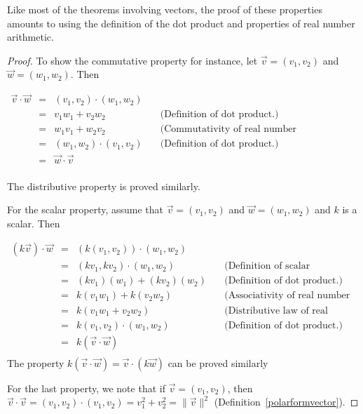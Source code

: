 \ifcourse
Like most of the theorems involving vectors, the proof of these properties amounts to using the definition of the dot product and properties of real number arithmetic.  
\ifanalysis

\begin{proof}
To show the commutative property for instance, let $\vec{v} = \left(v_1,v_2\right)$ and $\vec{w} = \left(w_1,w_2\right)$.  Then

\[ \begin{array}{rcll}

\vec{v} \cdot \vec{w} & = & \left(v_1,v_2\right)  \cdot \left(w_1,w_2\right)  & \\ [3pt]
										 & = & v_1w_1 + v_2w_2 & \quad\text{(Definition of dot product.)} \\ [3pt]
										 & = & w_1v_1 + w_2v_2 & \quad\text{(Commutativity of real number multiplication.)} \\ [3pt]
										 & = & \left(w_1,w_2\right)  \cdot  \left(v_1,v_2\right)  & \quad\text{(Definition of dot product.)} \\ [3pt]
										 & = & \vec{w} \cdot \vec{v} & \\ \end{array} \]

The distributive property is proved similarly.

\smallskip

For the scalar property, assume that $\vec{v} = \left(v_1,v_2\right)$ and $\vec{w} = \left(w_1,w_2\right)$ and $k$ is a scalar.  Then

\[ \begin{array}{rcll}

(k\vec{v}) \cdot \vec{w} & = & \left(k \left(v_1,v_2\right) \right) \cdot \left(w_1,w_2\right) & \\ [3pt]
												 & = &  \left(kv_1,kv_2\right)  \cdot \left(w_1,w_2\right) & \quad\text{(Definition of scalar multiplication.)} \\ [3pt]
												 & = & (kv_1)(w_1) + (kv_2)(w_2) & \quad\text{(Definition of dot product.)} \\ [3pt]
												 & = & k(v_1w_1) + k(v_2w_2) & \quad\text{(Associativity of real number multiplication.)} \\ [3pt]
												 & = & k(v_1w_1 + v_2w_2) & \quad\text{(Distributive law of real numbers.)} \\ [3pt]
												 & = & k \left(v_1,v_2\right)  \cdot \left(w_1,w_2\right) & \quad\text{(Definition of dot product.)} \\ [3pt]
												 & = & k (\vec{v} \cdot \vec{w}) & \\ \end{array} \]
\enlargethispage{.25in} The property $k(\vec{v} \cdot \vec{w}) = \vec{v} \cdot (k \vec{w})$ can be proved similarly

For the last property, we note that if  $\vec{v} = \left(v_1,v_2\right)$, then $\vec{v} \cdot \vec{v} = \left(v_1,v_2\right) \cdot \left(v_1,v_2\right) = v_1^2 + v_2^2 = \|\vec{v}\|^2$ (Definition~\ref{polarformvector}).
\end{proof}

